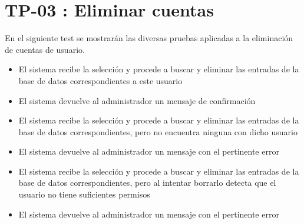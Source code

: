 \section{TP-03 : Eliminar cuentas}\label{sect:TP1}

En el siguiente test se mostrarán las diversas pruebas aplicadas a la eliminación de cuentas de usuario.


{
\begin{itemize}
\item  El sistema recibe la selección y procede a buscar y eliminar las entradas de la base de datos correspondientes a este usuario
\item El sistema devuelve al administrador un mensaje de confirmación
\end{itemize}}{}

{
\begin{itemize}
\item  El sistema recibe la selección y procede a buscar y eliminar las entradas de la base de datos correspondientes, pero no encuentra ninguna con dicho usuario
\item El sistema devuelve al administrador un mensaje con el pertinente error
\end{itemize}}{}

{
\begin{itemize}
\item  El sistema recibe la selección y procede a buscar y eliminar las entradas de la base de datos correspondientes, pero al intentar borrarlo detecta que el usuario no tiene suficientes permisos
\item El sistema devuelve al administrador un mensaje con el pertinente error
\end{itemize}}{}
